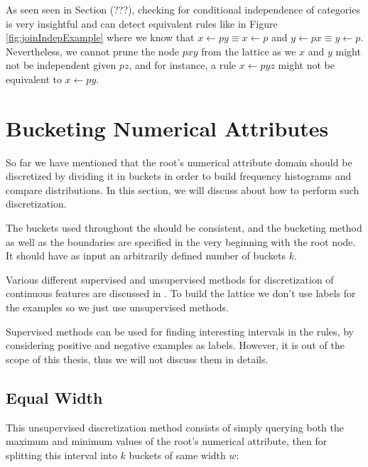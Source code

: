 


As seen seen in Section (???), checking for conditional independence of categories is very insightful and
can detect equivalent rules like in Figure \ref{fig:joinIndepExample} where we know that 
$x \leftarrow py \equiv x \leftarrow p$ and $y \leftarrow px \equiv y \leftarrow p$. Nevertheless, we cannot prune the
node $pxy$ from the lattice as we $x$ and $y$ might not be independent given $pz$, and for instance, a rule $x
\leftarrow pyz$ might not be equivalent to $x \leftarrow py$. 

\section{Bucketing Numerical Attributes}

So far we have mentioned that the root's numerical attribute domain should be discretized by dividing it in buckets in
order to build frequency histograms and compare distributions. In this section, we will discuss about how to perform
such discretization.

The buckets used throughout the \graphname should be consistent, and the bucketing method as well as the boundaries are
specified in the very beginning with the root node. It should have as input an arbitrarily defined number of buckets
$k$.

Various different supervised and unsupervised methods for discretization of continuous features are discussed in
\cite{Dougherty95supervisedand}. To build the lattice we don't use labels for the examples so we just use unsupervised
methods.

Supervised methods can be used for finding interesting intervals in the rules, by considering positive and negative
examples as labels. However, it is out of the scope of this thesis, thus we will not discuss them in details.

\subsection{Equal Width}
This unsupervised discretization method consists of simply querying both the maximum and minimum values of the root's
numerical attribute, then for splitting this interval into $k$ buckets of same width $w$:

